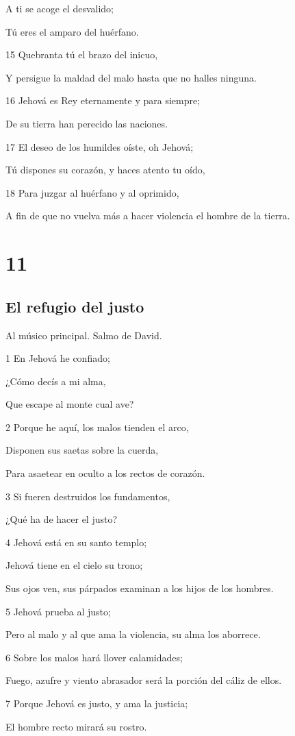 \par A ti se acoge el desvalido;
\par Tú eres el amparo del huérfano.
\par 15 Quebranta tú el brazo del inicuo,
\par Y persigue la maldad del malo hasta que no halles ninguna.
\par 16 Jehová es Rey eternamente y para siempre;
\par De su tierra han perecido las naciones.
\par 17 El deseo de los humildes oíste, oh Jehová;
\par Tú dispones su corazón, y haces atento tu oído,
\par 18 Para juzgar al huérfano y al oprimido,
\par A fin de que no vuelva más a hacer violencia el hombre de la tierra.

\chapter{11}

\section*{El refugio del justo}

\par Al músico principal. Salmo de David.

\par 1 En Jehová he confiado;
\par ¿Cómo decís a mi alma,
\par Que escape al monte cual ave?
\par 2 Porque he aquí, los malos tienden el arco,
\par Disponen sus saetas sobre la cuerda,
\par Para asaetear en oculto a los rectos de corazón.
\par 3 Si fueren destruidos los fundamentos,
\par ¿Qué ha de hacer el justo?
\par 4 Jehová está en su santo templo;
\par Jehová tiene en el cielo su trono;
\par Sus ojos ven, sus párpados examinan a los hijos de los hombres.
\par 5 Jehová prueba al justo;
\par Pero al malo y al que ama la violencia, su alma los aborrece.
\par 6 Sobre los malos hará llover calamidades;
\par Fuego, azufre y viento abrasador será la porción del cáliz de ellos.
\par 7 Porque Jehová es justo, y ama la justicia;
\par El hombre recto mirará su rostro.

